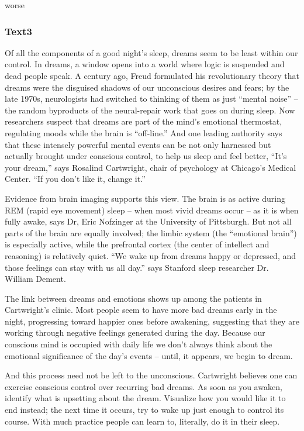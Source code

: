 \documentclass[a4paper]{article}
\begin{document}
worse\\\subsubsection{Text3}

\par
Of all the components of a good night’s sleep, dreams seem to be least within our control. In dreams, a window opens into a world where logic is suspended and dead people speak. A century ago, Freud formulated his revolutionary theory that dreams were the disguised shadows of our unconscious desires and fears; by the late 1970s, neurologists had switched to thinking of them as just “mental noise” -- the random byproducts of the neural-repair work that goes on during sleep. Now researchers suspect that dreams are part of the mind’s emotional thermostat, regulating moods while the brain is “off-line.” And one leading authority says that these intensely powerful mental events can be not only harnessed but actually brought under conscious control, to help us sleep and feel better, “It’s your dream,” says Rosalind Cartwright, chair of psychology at Chicago’s Medical Center. “If you don’t like it, change it.”

\par
Evidence from brain imaging supports this view. The brain is as active during REM (rapid eye movement) sleep -- when most vivid dreams occur -- as it is when fully awake, says Dr, Eric Nofzinger at the University of Pittsburgh. But not all parts of the brain are equally involved; the limbic system (the “emotional brain”) is especially active, while the prefrontal cortex (the center of intellect and reasoning) is relatively quiet. “We wake up from dreams happy or depressed, and those feelings can stay with us all day.” says Stanford sleep researcher Dr. William Dement.

\par
The link between dreams and emotions shows up among the patients in Cartwright’s clinic. Most people seem to have more bad dreams early in the night, progressing toward happier ones before awakening, suggesting that they are working through negative feelings generated during the day. Because our conscious mind is occupied with daily life we don’t always think about the emotional significance of the day’s events -- until, it appears, we begin to dream.

\par
And this process need not be left to the unconscious. Cartwright believes one can exercise conscious control over recurring bad dreams. As soon as you awaken, identify what is upsetting about the dream. Visualize how you would like it to end instead; the next time it occurs, try to wake up just enough to control its course. With much practice people can learn to, literally, do it in their sleep.
\end{document}

